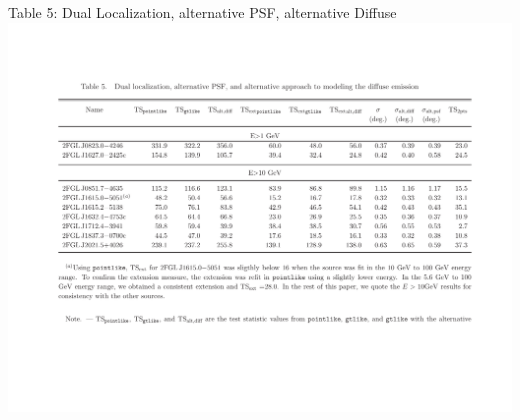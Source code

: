 \documentclass[12pt]{beamer}
\begin{document}
\begin{frame}{Table 5: Dual Localization, alternative PSF, alternative Diffuse}
  \includegraphics[scale=0.40]{plots/alt_diff.pdf}
\end{frame}
\end{document}
